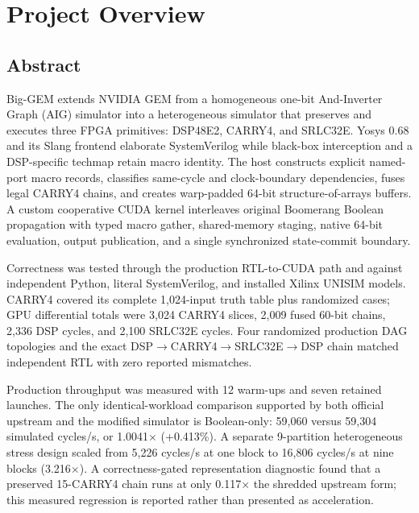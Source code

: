 \documentclass[11pt,a4paper]{article}
\begin{document}
\tableofcontents
\newpage

\section{Project Overview}

\subsection{Abstract}

Big-GEM extends NVIDIA GEM from a homogeneous one-bit And-Inverter Graph (AIG)
simulator into a heterogeneous simulator that preserves and executes three FPGA
primitives: DSP48E2, CARRY4, and SRLC32E.  Yosys 0.68 and its Slang frontend
elaborate SystemVerilog while black-box interception and a DSP-specific techmap
retain macro identity.  The host constructs explicit named-port macro records,
classifies same-cycle and clock-boundary dependencies, fuses legal CARRY4 chains,
and creates warp-padded 64-bit structure-of-arrays buffers.  A custom cooperative
CUDA kernel interleaves original Boomerang Boolean propagation with typed macro
gather, shared-memory staging, native 64-bit evaluation, output publication, and a
single synchronized state-commit boundary.

Correctness was tested through the production RTL-to-CUDA path and against
independent Python, literal SystemVerilog, and installed Xilinx UNISIM models.
CARRY4 covered its complete 1,024-input truth table plus randomized cases; GPU
differential totals were 3,024 CARRY4 slices, 2,009 fused 60-bit chains, 2,336
DSP cycles, and 2,100 SRLC32E cycles.  Four randomized production DAG topologies
and the exact DSP$\rightarrow$CARRY4$\rightarrow$SRLC32E$\rightarrow$DSP chain
matched independent RTL with zero reported mismatches.

Production throughput was measured with 12 warm-ups and seven retained launches.
The only identical-workload comparison supported by both official upstream and
the modified simulator is Boolean-only: 59,060 versus 59,304 simulated cycles/s,
or 1.0041$\times$ (+0.413\%).  A separate 9-partition heterogeneous stress design
scaled from 5,226 cycles/s at one block to 16,806 cycles/s at nine blocks
(3.216$\times$).  A correctness-gated representation diagnostic found that a
preserved 15-CARRY4 chain runs at only 0.117$\times$ the shredded upstream form;
this measured regression is reported rather than presented as acceleration.
\end{document}

